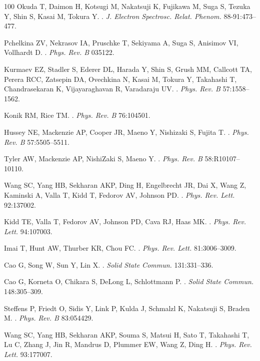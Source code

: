 \documentclass[]{ar2e-changed}%
\begin{document}
\begin{thebibliography}{100}
Okuda T, Daimon H, Kotsugi M, Nakatsuji K, Fujikawa M, Suga S, Tezuka Y, Shin
  S, Kasai M, Tokura Y.
.
\newblock \emph{J. Electron Spectrosc. Relat. Phenom.} 88-91:473--477.

Pchelkina ZV, Nekrasov IA, Pruschke T, Sekiyama A, Suga S, Anisimov VI,
  Vollhardt D.
.
\newblock \emph{Phys. Rev. B} 035122.

Kurmaev EZ, Stadler S, Ederer DL, Harada Y, Shin S, Grush MM, Callcott TA,
  Perera RCC, Zatsepin DA, Ovechkina N, Kasai M, Tokura Y, Takahashi T,
  Chandrasekaran K, Vijayaraghavan R, Varadaraju UV.
.
\newblock \emph{Phys. Rev. B} 57:1558--1562.

Konik RM, Rice TM.
.
\newblock \emph{Phys. Rev. B} 76:104501.

Hussey NE, Mackenzie AP, Cooper JR, Maeno Y, Nishizaki S, Fujita T.
.
\newblock \emph{Phys. Rev. B} 57:5505--5511.

Tyler AW, Mackenzie AP, NishiZaki S, Maeno Y.
.
\newblock \emph{Phys. Rev. B} 58:R10107--10110.

Wang SC, Yang HB, Sekharan AKP, Ding H, Engelbrecht JR, Dai X, Wang Z, Kaminski
  A, Valla T, Kidd T, Fedorov AV, Johnson PD.
.
\newblock \emph{Phys. Rev. Lett.} 92:137002.

Kidd TE, Valla T, Fedorov AV, Johnson PD, Cava RJ, Haas MK.
.
\newblock \emph{Phys. Rev. Lett.} 94:107003.

Imai T, Hunt AW, Thurber KR, Chou FC.
.
\newblock \emph{Phys. Rev. Lett.} 81:3006--3009.

Cao G, Song W, Sun Y, Lin X.
.
\newblock \emph{Solid State Commun.} 131:331--336.

Cao G, Korneta O, Chikara S, DeLong L, Schlottmann P.
.
\newblock \emph{Solid State Commun.} 148:305--309.

Steffens P, Friedt O, Sidis Y, Link P, Kulda J, Schmalzl K, Nakatsuji S, Braden
  M.
.
\newblock \emph{Phys. Rev. B} 83:054429.

Wang SC, Yang HB, Sekharan AKP, Souma S, Matsui H, Sato T, Takahashi T, Lu C,
  Zhang J, Jin R, Mandrus D, Plummer EW, Wang Z, Ding H.
.
\newblock \emph{Phys. Rev. Lett.} 93:177007.


\end{thebibliography}
\end{document}
